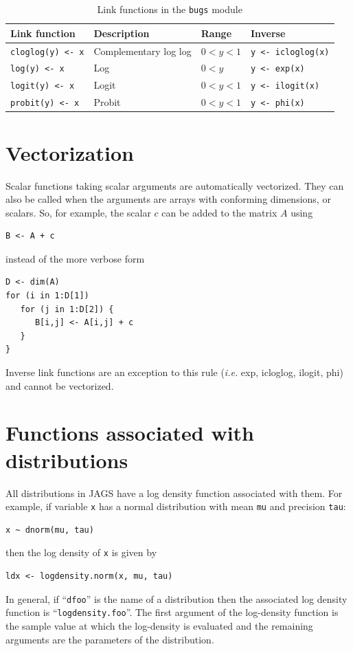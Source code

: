 \documentclass[11pt, a4paper, titlepage]{report}
\begin{document}
\begin{table}
\begin{center}
\begin{tabular}{llll}
\hline
Link function         & Description & Range & Inverse \\
\hline
\verb+cloglog(y) <- x+ & Complementary log log & $0 < y < 1$ & \verb+y <- icloglog(x)+ \\
\verb+log(y) <- x+    & Log           & $0 < y$ &  \verb+y <- exp(x)+ \\
\verb+logit(y) <- x+  & Logit         & $0 < y < 1$ &  \verb+y <- ilogit(x)+ \\
\verb+probit(y) <- x+ & Probit        & $0 < y < 1$ &  \verb+y <- phi(x)+\\
\hline
\end{tabular}
\caption{Link functions in the \texttt{bugs} module \label{table:bugs:link}}
\end{center}
\end{table}


\section{Vectorization}

Scalar functions taking scalar arguments are automatically vectorized.
They can also be called when the arguments are arrays with conforming
dimensions, or scalars. So, for example, the scalar $c$ can be added to
the matrix $A$ using
\begin{verbatim}
B <- A + c
\end{verbatim}
instead of the more verbose form
\begin{verbatim}
D <- dim(A)
for (i in 1:D[1])
   for (j in 1:D[2]) {
      B[i,j] <- A[i,j] + c
   }
}
\end{verbatim}
Inverse link functions are an exception to this rule ({\em i.e.} exp,
icloglog, ilogit, phi) and cannot be vectorized. 



\section{Functions associated with distributions}

All distributions in JAGS have a log density function associated with
them.  For example, if variable \texttt{x} has a normal distribution
with mean \texttt{mu} and precision \texttt{tau}:
\begin{verbatim}
x ~ dnorm(mu, tau)
\end{verbatim}
then the log density of \texttt{x} is given by
\begin{verbatim}
ldx <- logdensity.norm(x, mu, tau)
\end{verbatim}
In general, if ``\texttt{dfoo}'' is the name of a distribution then
the associated log density function is
``\texttt{logdensity.foo}''. The first argument of the log-density
function is the sample value at which the log-density is evaluated and
the remaining arguments are the parameters of the distribution.
\end{document}
